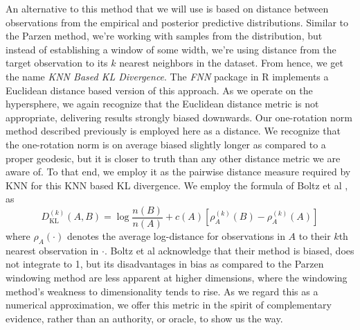 An alternative to this method that we will use is based on distance between observations from the
  empirical and posterior predictive distributions.  Similar to the Parzen method, we're working
  with samples from the distribution, but instead of establishing a window of some width, we're
  using distance from the target observation to its $k$ nearest neighbors in the dataset.
  From hence, we get the name \emph{KNN Based KL Divergence}.  The \emph{FNN} package in R implements
  a Euclidean distance based version of this approach.  As we operate on the hypersphere, we again
  recognize that the Euclidean distance metric is not appropriate, delivering results strongly
  biased downwards.  Our one-rotation norm method described previously is employed here as a
  distance.  We recognize that the one-rotation norm is on average biased slightly longer as
  compared to a proper geodesic, but it is closer to truth than any other distance metric we are
  aware of.  To that end, we employ it as the pairwise distance measure required by KNN for this KNN
  based KL divergence.  We employ the formula of Boltz et al \cite{boltz2009}, as
  \begin{equation}
    \label{eqn:knnkld}
    D_{\text{KL}}^{(k)}(A,B) = \log\frac{n(B)}{n(A)} + c(A) \left[\rho_A^{(k)}(B)
                                                                      - \rho_A^{(k)}(A)\right]
  \end{equation}
  where $\rho_A(\cdot)$ denotes the average log-distance for observations in $A$ to their $k$th
  nearest observation in $\cdot$.  Boltz et al acknowledge that their method is biased, does not
  integrate to 1, but its disadvantages in bias as compared to the Parzen windowing method are less
  apparent at higher dimensions, where the windowing method's weakness to dimensionality tends to
  rise.  As we regard this as a numerical approximation, we offer this metric in the spirit of
  complementary evidence, rather than an authority, or oracle, to show us the way.































